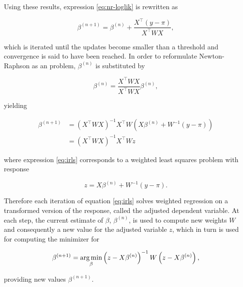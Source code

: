 Using these results, expression \ref{eq:nr-loglik} is rewritten as

\begin{equation}
  \beta^{(n+1)} = \beta^{(n)} + \frac{X^\intercal (y - \pi)}{X^\intercal W X},
\end{equation}

which is iterated until the updates become smaller than a threshold and convergence is said to have been reached. In order to reformulate Newton-Raphson as an  problem, $\beta^{(n)}$ is substituted by

\begin{equation*}
  \beta^{(n)} = \frac{X^\intercal W X}{X^\intercal W X} \beta^{(n)},
\end{equation*}

yielding

\begin{subequations}
\begin{align}
  \beta^{(n+1)} &= \left(X^\intercal W X\right)^{-1} X^\intercal W \left(X \beta^{(n)} + W^{-1} (y - \pi)\right) \\
  &= \left(X^\intercal W X\right)^{-1} X^\intercal W z \label{eq:irls}
\end{align}
\end{subequations}

where expression \ref{eq:irls} corresponds to a weighted least squares problem with response

\begin{equation*}
  z = X \beta^{(n)} + W^{-1} (y - \pi).
\end{equation*}

Therefore each iteration of equation \ref{eq:irls} solves weighted regression on a transformed version of the response, called the adjusted dependent variable. At each step, the current estimate of $\beta$, $\beta^{(n)}$, is used to compute new weights $W$ and consequently a new value for the adjusted variable $z$, which in turn is used for computing the minimizer for

\begin{equation}
  \beta^{(n+1)} = \operatorname*{arg\, min}_{\beta} \left(z-X\beta^{(n)}\right)^{-1} W \left(z-X\beta^{(n)}\right),
\end{equation}

providing new values $\beta^{(n+1)}$.


